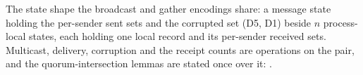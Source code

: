 \begin{definition}
  \label{def:aba-msgstate}
  \leanok
  The state shape the broadcast and gather encodings share: a message state holding the per-sender sent sets and the corrupted set (D5, D1) beside $n$ process-local states, each holding one local record and its per-sender received sets.
  Multicast, delivery, corruption and the receipt counts are operations on the pair, and the quorum-intersection lemmas are stated once over it: .
\end{definition}
